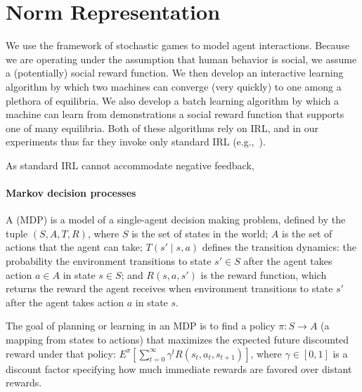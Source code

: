 
\section{Norm Representation}
\label{sec:representation}

We use the framework of stochastic games to model agent interactions.
Because we are operating under the assumption that human behavior is
social, we assume a (potentially) social reward function.  We then
develop an interactive learning algorithm by which two machines can
converge (very quickly) to one among a plethora of equilibria.  We
also develop a batch learning algorithm by which a machine can learn
from demonstrations a social reward function that supports one of many
equilibria.  Both of these algorithms rely on IRL, and in our
experiments thus far they invoke only standard IRL (e.g.,~\cite{MLIRL, BIRL}).

As standard IRL cannot accommodate negative feedback,

\paragraph{Markov decision processes}

A  (MDP) is a model of a single-agent
decision making problem, defined by the tuple $(S, A, T, R)$, where
$S$ is the set of states in the world; $A$ is the set of actions that
the agent can take; $T(s' \mid s, a)$ defines the transition dynamics:
the probability the environment transitions to state $s' \in S$
after the agent takes action $a \in A$ in state $s \in S$; and 
$R(s, a, s')$ is the reward function, which returns the reward the
agent receives when environment transitions to state $s'$ after the
agent takes action $a$ in state $s$.

The goal of planning or learning in an MDP is to find a policy $\pi :
S \rightarrow A$ (a mapping from states to actions) that maximizes the
expected future discounted reward under that policy: $E^{\pi} \left[
  \sum_{t=0}^\infty \gamma^t R(s_t, a_t, s_{t+1}) \right]$, where
$\gamma \in [0, 1]$ is a discount factor specifying how much immediate
rewards are favored over distant rewards. 

